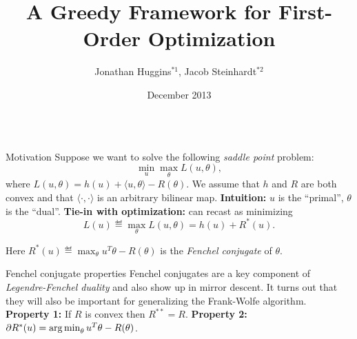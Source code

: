 \documentclass[final]{beamer}
\title%
{A Greedy Framework for First-Order Optimization}
\author%
{Jonathan Huggins$^{*1}$, Jacob Steinhardt$^{*2}$}
\institute[] %
{$^{*}$Both authors contributed equally to this work. $^1$Massachusetts Institute of Technology. $^{2}$Stanford University.}
\date{December 2013}
\begin{document}
\begin{frame}{} 
\begin{columns}

\begin{column}{0.46\linewidth}

\begin{block}{\large Motivation}
Suppose we want to solve the following \emph{saddle point} problem:
\[ \min_u \max_{\theta} L(u, \theta), \]
where $L(u,\theta) = h(u) + \langle u, \theta \rangle - R(\theta)$. 
We assume that $h$ and $R$ are both convex and that $\langle \cdot, \cdot \rangle$ 
is an arbitrary bilinear map.
\newline\newline
\textbf{Intuition:} $u$ is the ``primal'', $\theta$ is the ``dual''.
\newline\newline
\textbf{Tie-in with optimization:} can recast as minimizing
\[ L(u) \eqdef \max_{\theta} L(u, \theta) = h(u) + R^*(u). \]

Here $R^*(u) \eqdef \max_{\theta} u^T\theta - R(\theta)$ is the 
\emph{Fenchel conjugate} of $\theta$.
\end{block}

\begin{block}{\large Fenchel conjugate properties}
Fenchel conjugates are a key component of \emph{Legendre-Fenchel duality} 
and also show up in mirror descent. It turns out that they will also be 
important for generalizing the Frank-Wolfe algorithm.
\newline\newline
\textbf{Property 1:} If $R$ is convex then $R^{**} = R$.
\qquad\qquad
\textbf{Property 2:} $\partial R^*(u) = \argmin_{\theta} u^T\theta - R(\theta)$.
\end{block}


\end{column}
\end{columns}
\end{frame}
\end{document}

